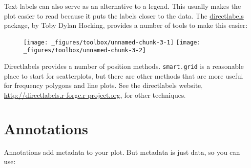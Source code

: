 Text labels can also serve as an alternative to a legend. This usually
makes the plot easier to read because it puts the labels closer to the
data. The \href{https://github.com/tdhock/directlabels}{directlabels}
package, by Toby Dylan Hocking, provides a number of tools to make this
easier: 

\begin{Shaded}
\begin{Highlighting}[]
\OperatorTok{+}\StringTok{ }
\StringTok{  }\NormalTok{()}

\OperatorTok{+}\StringTok{ }
\StringTok{  }\NormalTok{(} \NormalTok{) }\OperatorTok{+}
\StringTok{  }\OperatorTok{::}\NormalTok{(}\NormalTok{(} \NormalTok{)}
\end{Highlighting}
\end{Shaded}

\begin{figure}[H]
  \texttt{[image: \_figures/toolbox/unnamed-chunk-3-1]}%
  \texttt{[image: \_figures/toolbox/unnamed-chunk-3-2]}
\end{figure}

Directlabels provides a number of position methods. \texttt{smart.grid}
is a reasonable place to start for scatterplots, but there are other
methods that are more useful for frequency polygons and line plots. See
the directlabels website,
\url{http://directlabels.r-forge.r-project.org}, for other techniques.

\hypertarget{sec:annotations}{%
\section{Annotations}\label{sec:annotations}}

Annotations add metadata to your plot. But metadata is just data, so you
can use:  

